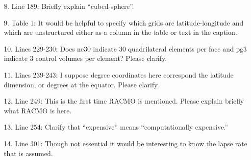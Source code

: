 \documentclass[12pt,oneside,a4paper]{article}%
\begin{document}
{\color{blue}{Done.}} \newline

8. Line 189: Briefly explain “cubed-sphere”.  \newline

{\color{blue}{Done.}} \newline

9. Table 1: It would be helpful to specify which grids are latitude-longitude and which are unstructured either as a column in the table or text in the caption.  \newline

{\color{blue}{Added to the text which grids are lat-lon and which are unstructured.}} \newline

10. Lines 229-230: Does ne30 indicate 30 quadrilateral elements per face and pg3 indicate 3 control volumes per element? Please clarify. \newline

{\color{blue}{The text indicates that ne30 indicates are 30x30 elements per cube-face, and pg3 refers to 3x3 control volumes per element. The global number of grid columns is then 6 faces * 30x30 elements per face * 3x3 control volumes per element.}} \newline

11. Lines 239-243: I suppose degree coordinates here correspond the latitude dimension, or degrees at the equator. Please clarify.  \newline

{\color{blue}{Done.}} \newline

12. Line 249: This is the first time RACMO is mentioned. Please explain briefly what RACMO is here.  \newline

{\color{blue}{Fixed.}} \newline

13. Line 254: Clarify that “expensive” means “computationally expensive.” \newline

{\color{blue}{This information has been absorbed into a new sub-section on computational costs. References to ``cheaper" or ``more expensive" are more obviously referring computational costs as that is the title of the section.}} \newline

14. Line 301: Though not essential it would be interesting to know the lapse rate that is assumed. \newline
\end{document}
